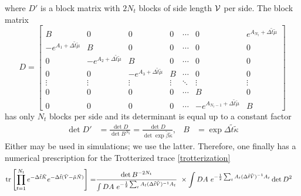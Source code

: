 where $D'$ is a block matrix with $2N_t$ blocks of side length $\mathcal{V}$ per side.
The block matrix
\begin{equation}
	D
	=
	\begin{bmatrix}
		B                                      & 0                                      & 0                                      & 0      & \cdots & 0                                            & e^{A_{N_t}+ \Delta \tilde{t} \tilde{\mu}}
	\\	-e^{A_1+ \Delta \tilde{t} \tilde{\mu}} & B                                      & 0                                      & 0      & \cdots & 0                                            & 0
	\\	0                                      & -e^{A_2+ \Delta \tilde{t} \tilde{\mu}} & B                                      & 0      & \cdots & 0                                            & 0
	\\	0                                      & 0                                      & -e^{A_3+ \Delta \tilde{t} \tilde{\mu}} & B      & \cdots & 0                                            & 0
	\\	\vdots                                 & \vdots                                 & \vdots                                 & \vdots & \ddots & \vdots                                       & \vdots
	\\	0                                      & 0                                      & 0                                      & 0      & \cdots & B                                            & 0
	\\	0                                      & 0                                      & 0                                      & 0      & \cdots & -e^{A_{N_t-1}+ \Delta \tilde{t} \tilde{\mu}} & B
	\end{bmatrix}
	\label{eq:fermion matrix}
\end{equation} 
has only $N_t$ blocks per side and its determinant is equal up to a constant factor
\begin{align}
	\det D' &= \frac{ \det D }{ \det B^{N_t} } = \frac{ \det D }{ \det \exp \tilde{\beta} \tilde{\kappa} },
	&
	B &= \exp \Delta\tilde{t} \tilde{\kappa}
\end{align}
Either may be used in simulations; we use the latter.
Therefore, one finally has a numerical prescription for the Trotterized trace \eqref{trotterization}
\begin{align}
	\text{tr}\left[ \prod_{t=1}^{N_t} e^{-\Delta \tilde{t}\tilde{K}}  e^{-\Delta \tilde{t} (\tilde{V} - \tilde{\mu}\tilde{N})}  \right]
	=&
	\frac{\det B^{-2N_t}}{ \int DA ~ e^{-\frac{1}{2} \sum_t A_t (\Delta\tilde{t}\tilde{V})^{-1} A_t } } ~ \times
	\int DA ~ e^{-\frac{1}{2} \sum_t A_t (\Delta\tilde{t}\tilde{V})^{-1} A_t } \det D^2
\end{align}
